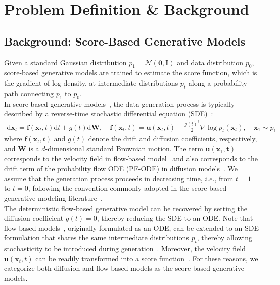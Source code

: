 \section{Problem Definition \& Background}
\label{sec:problem definition and related_work}
\subsection{Background: Score-Based Generative Models}
\label{sec:problem definition and background:score based gnerative models}
Given a standard Gaussian distribution $p_1=\mathcal{N}(\mathbf{0}, \mathbf{I})$ and data distribution $p_0$, score-based generative models are trained to estimate the score function, which is the gradient of log-density, at intermediate distributions $p_t$ along a probability path connecting $p_1$ to $p_0$.\\
In score-based generative models~\cite{sohldickstein2015deep, song2020sde, ho2020ddpm, albergo2023stochasticinterpolantsunifyingframework, ma2024sitexploringflowdiffusionbased}, the data generation process is typically described by a reverse-time stochastic differential equation (SDE)~\cite{song2020sde}:
\begin{align}
    \label{eq:preliminaries:pretrained model SDE}
    \mathrm{d}\mathbf{x}_t = \mathbf{f}(\mathbf{x}_t, t)\mathrm{d}t + g(t)\mathrm{d}\mathbf{W},\quad \mathbf{f}(\mathbf{x}_t, t) = \mathbf{u}(\mathbf{x}_t, t) - \frac{g(t)^2}{2} \nabla \log p_t(\mathbf{x}_t),\quad \mathbf{x}_1\sim p_1
\end{align}
where $\mathbf{f}(\mathbf{x}_t, t)$ and $g(t)$ denote the drift and diffusion coefficients, respectively, and $\mathbf{W}$ is a $d$-dimensional standard Brownian motion. 
The term $\mathbf{u}(\mathbf{x_t, t})$ corresponds to the velocity field in flow-based model~\cite{lipman2023flow, liu2023flow, lipman2024flowmatchingguidecode} and also corresponds to the drift term of the probability flow ODE (PF-ODE) in diffusion models~\cite{song2020sde}. We assume that the generation process proceeds in decreasing time, $i.e.$, from $t=1$ to $t=0$, following the convention commonly adopted in the score-based generative modeling literature~\cite{song2020sde, ho2020ddpm}. \\
The deterministic flow-based generative model can be recovered by setting the diffusion coefficient $g(t) = 0$, thereby reducing the SDE to an ODE.
Note that flow-based models~\cite{lipman2023flow, liu2023flow}, originally formulated as an ODE, can be extended to an SDE formulation that shares the same intermediate distributions $p_t$, thereby allowing stochasticity to be introduced during generation~\cite{ma2024sitexploringflowdiffusionbased, albergo2023stochasticinterpolantsunifyingframework, kim2025inference}. Moreover, the velocity field $\mathbf{u}(\mathbf{x}_t, t)$ can be readily transformed into a score function~\cite{ma2024sitexploringflowdiffusionbased, lipman2024flowmatchingguidecode}. For these reasons, we categorize both diffusion and flow-based models as the score-based generative models.

